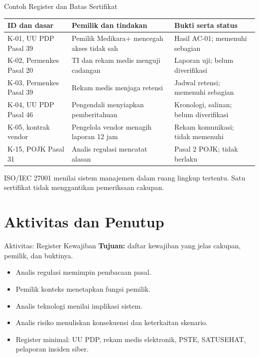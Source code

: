 \documentclass[aspectratio=169, table, 12pt]{beamer}
\begin{document}
\begin{frame}{{\Large Contoh Register dan Batas Sertifikat}}
  \vspace{2pt}
  \scriptsize
  \begin{tabularx}{\textwidth}{|>{\raggedright\arraybackslash}p{}|>{\raggedright\arraybackslash}X|>{\raggedright\arraybackslash}X|}
    \hline
    \textbf{ID dan dasar} & \textbf{Pemilik dan tindakan} & \textbf{Bukti serta status} \\ \hline
    K-01, UU PDP Pasal 39 & Pemilik Medikara+ mencegah akses tidak sah & Hasil AC-01; memenuhi sebagian \\ \hline
    K-02, Permenkes Pasal 20 & TI dan rekam medis menguji cadangan & Laporan uji; belum diverifikasi \\ \hline
    K-03, Permenkes Pasal 39 & Rekam medis menjaga retensi & Jadwal retensi; memenuhi sebagian \\ \hline
    K-04, UU PDP Pasal 46 & Pengendali menyiapkan pemberitahuan & Kronologi, salinan; belum diverifikasi \\ \hline
    K-05, kontrak vendor & Pengelola vendor menagih laporan 12 jam & Rekam komunikasi; tidak memenuhi \\ \hline
    K-15, POJK Pasal 31 & Analis regulasi mencatat alasan & Pasal 2 POJK; tidak berlaku \\ \hline
  \end{tabularx}

  \vspace{6pt}
  \small ISO/IEC 27001 menilai sistem manajemen dalam ruang lingkup tertentu. Satu sertifikat tidak menggantikan
  pemeriksaan cakupan.
\end{frame}

\section{Aktivitas dan Penutup}

\begin{frame}{{\Large Aktivitas: Register Kewajiban}}
  \vspace{4pt}
  \small
  \textbf{Tujuan:} daftar kewajiban yang jelas cakupan, pemilik, dan buktinya.

  \vspace{4pt}
  \begin{itemize}
    \item Analis regulasi memimpin pembacaan pasal.
    \item Pemilik konteks menetapkan fungsi pemilik.
    \item Analis teknologi menilai implikasi sistem.
    \item Analis risiko menuliskan konsekuensi dan keterkaitan skenario.
    \item Register minimal: UU PDP, rekam medis elektronik, PSTE, SATUSEHAT, pelaporan insiden siber.
  \end{itemize}
\end{frame}
\end{document}
